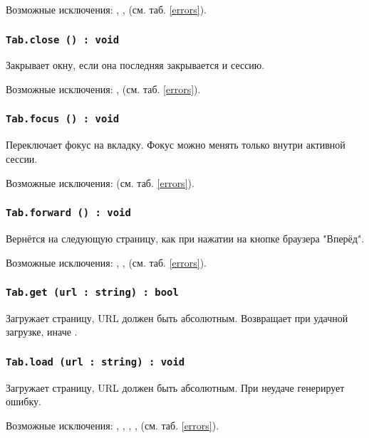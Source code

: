 Возможные исключения: , ,  (см. таб. \ref{errors}).

\subsubsection{\texttt{Tab.close () : void}}

Закрывает окну, если она последняя закрывается и сессию.

Возможные исключения: ,  (см. таб. \ref{errors}).

\subsubsection{\texttt{Tab.focus () : void}}

Переключает фокус на вкладку. Фокус можно менять только внутри активной сессии.

Возможные исключения:  (см. таб. \ref{errors}).

\subsubsection{\texttt{Tab.forward () : void}}

Вернётся на следующую страницу, как при нажатии на кнопке браузера "Вперёд".

Возможные исключения: , ,  (см. таб. \ref{errors}).

\subsubsection{\texttt{Tab.get (url : string) : bool}}

Загружает страницу, URL должен быть абсолютным. Возвращает \true{} при удачной загрузке, иначе \false.

\subsubsection{\texttt{Tab.load (url : string) : void}}

Загружает страницу, URL должен быть абсолютным. При неудаче генерирует ошибку.

Возможные исключения: , , , ,  (см. таб. \ref{errors}).

